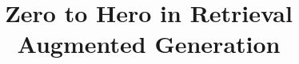 \documentclass[xcolor=dvipsnames,compress,t,pdf,9pt]{beamer}
\title[\insertframenumber /\inserttotalframenumber]{ Zero to Hero in Retrieval Augmented Generation}
\begin{document}
	\begin{frame}
	\titlepage
	\end{frame}
	

	
\end{document}
